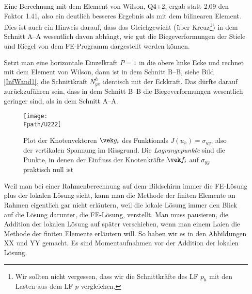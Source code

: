 {Eine Berechnung mit dem Element von Wilson, Q4+2, ergab statt 2.09 den Faktor 1.41, also
ein deutlich besseres Ergebnis als mit dem bilinearen Element. Dies ist auch ein Hinweis
darauf, dass das Gleichgewicht (\"{u}ber Kreuz\footnote{Wir sollten nicht vergessen, dass
wir die Schnittkr\"{a}fte des LF $p_h$ mit den Lasten aus dem LF $p$ vergleichen.}) in dem
Schnitt A--A wesentlich davon abh\"{a}ngt, wie gut die Biegeverformungen der Stiele und Riegel
von dem FE-Programm dargestellt werden k\"{o}nnen.

Setzt man eine horizontale Einzelkraft $P = 1$ in die obere linke Ecke und rechnet mit
dem Element von Wilson, dann ist in dem Schnitt B--B, siehe Bild \ref{InfWand1}, die
Schnittkraft $N_{yx}^h$ identisch mit der Eckkraft. Das d\"{u}rfte darauf zur\"{u}ckzuf\"{u}hren
sein, dass in dem Schnitt B--B die Biegeverformungen wesentlich geringer sind, als in
dem Schnitt A--A.


\begin{figure}
\centering
{\texttt{[image: \\Fpath/U222]}}
  \caption{Plot der Knotenvektoren $\vek g_i$ des Funktionals $J(u_h) = \sigma_{yy}$, also der vertikalen Spannung im Rissgrund. Die {\em Lagrangepunkte\/} sind die Punkte, in denen der Einfluss der Knotenkr\"{a}fte $\vek f_i$ auf $\sigma_{yy}$ praktisch null ist}
  \label{U222}
\end{figure}%


Weil man bei einer Rahmenberechnung auf dem Bildschirm immer die FE-L\"{o}sung plus der lokalen L\"{o}sung sieht, kann man die Methode der finiten Elemente an Rahmen eigentlich gar nicht erl\"{a}utern, weil die lokale L\"{o}sung immer den Blick auf die L\"{o}sung darunter, die FE-L\"{o}sung, verstellt. Man muss pausieren, die Addition der lokalen L\"{o}sung auf sp\"{a}ter verschieben, wenn man einem Laien die Methode der finiten Elemente erl\"{a}utern will. So haben wir es in den Abbildungen XX und YY gemacht. Es sind Momentaufnahmen vor der Addition der lokalen L\"{o}sung.


}
